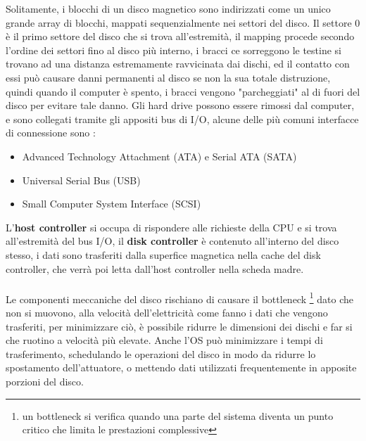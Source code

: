 \documentclass[12pt, letterpaper]{article}
\newcommand{\acc}{\\\hphantom{}\\}
\begin{document}
Solitamente, i blocchi di un disco magnetico sono indirizzati come un unico grande array di blocchi, mappati 
sequenzialmente nei settori del disco. Il settore 0 è il primo settore del disco che si trova all'estremità, il mapping 
procede secondo l'ordine dei settori fino al disco più interno, i bracci ce sorreggono le testine si trovano ad una 
distanza estremamente ravvicinata dai dischi, ed il contatto con essi può causare danni permanenti al disco se non 
la sua totale distruzione, quindi quando il computer è spento, i bracci vengono "parcheggiati" al di fuori del disco per 
evitare tale danno. Gli hard drive possono essere rimossi dal computer, e sono collegati tramite gli appositi 
bus di I/O, alcune delle più comuni interfacce di connessione sono : \begin{itemize}
    \item Advanced Technology Attachment (ATA) e Serial ATA (SATA)
    \item Universal Serial Bus (USB)
    \item Small Computer System Interface (SCSI)
\end{itemize}
L'\textbf{host controller} si occupa di rispondere alle richieste della CPU e si trova all'estremità del bus I/O,  il 
\textbf{disk controller} è contenuto all'interno del disco stesso, i dati sono trasferiti dalla superfice magnetica 
nella cache del disk controller, che verrà poi letta dall'host controller nella scheda madre.\acc 
Le componenti meccaniche del disco rischiano di causare il bottleneck \footnote{
    un bottleneck si verifica quando una parte del sistema diventa un punto critico che limita le prestazioni complessive
} dato che non si muovono, alla velocità dell'elettricità 
come fanno i dati che vengono trasferiti, per minimizzare ciò, è possibile ridurre le dimensioni dei dischi e far si che 
ruotino a velocità più elevate. Anche l'OS può minimizzare i tempi di trasferimento, schedulando le operazioni del disco 
in modo da ridurre lo spostamento dell'attuatore, o mettendo dati utilizzati frequentemente in apposite porzioni del disco.
\end{document}
